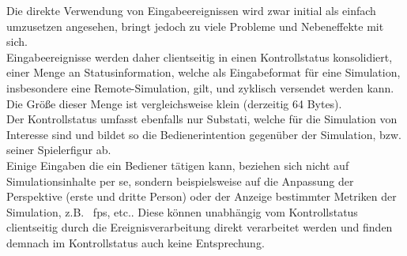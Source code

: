 Die direkte Verwendung von Eingabeereignissen wird zwar initial als einfach umzusetzen angesehen, bringt jedoch zu viele Probleme und Nebeneffekte mit sich.\\
Eingabeereignisse werden daher clientseitig in einen Kontrollstatus konsolidiert, einer Menge an Statusinformation, welche als Eingabeformat für eine Simulation, insbesondere eine Remote-Simulation, gilt, und zyklisch versendet werden kann. Die Größe dieser Menge ist vergleichsweise klein (derzeitig 64 Bytes).\\
Der Kontrollstatus umfasst ebenfalls nur Substati, welche für die Simulation von Interesse sind und bildet so die Bedienerintention gegenüber der Simulation, bzw. seiner Spielerfigur ab.\\
Einige Eingaben die ein Bediener tätigen kann, beziehen sich nicht auf Simulationsinhalte per se, sondern beispielsweise auf die Anpassung der Perspektive (erste und dritte Person) oder der Anzeige bestimmter Metriken der Simulation, z.B.~ fps, etc.. Diese können unabhängig vom Kontrollstatus clientseitig durch die Ereignisverarbeitung direkt verarbeitet werden und finden demnach im Kontrollstatus auch keine Entsprechung.\\

